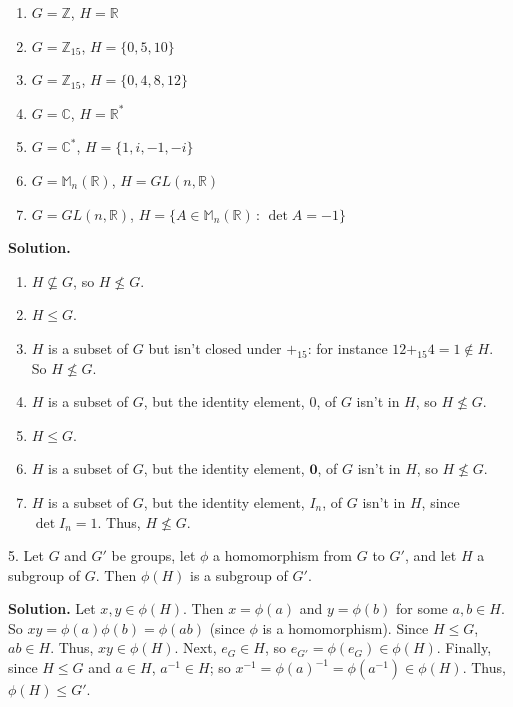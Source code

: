 \documentclass[10pt,]{book}
\theoremstyle{plain}
\theoremstyle{definition}
\theoremstyle{definition}
\theoremstyle{definition}
\theoremstyle{definition}
\numberwithin{equation}{section}
\def\Z{\mathbb{Z}}
\def\R{\mathbb{R}}
\def\C{\mathbb{C}}
\def\M{\mathbb{M}}
\def\0{\mathbf 0}
\begin{document}
\begin{exerciselist}
\begin{enumerate}[label=(\alph*)]
\item\hypertarget{li-232}{}\(G=\Z\), \(H=\R\)%
\item\hypertarget{li-233}{}\(G=\Z_{15}\), \(H=\{0,5,10\}\)%
\item\hypertarget{li-234}{}\(G=\Z_{15}\), \(H=\{0,4,8,12\}\)%
\item\hypertarget{li-235}{}\(G=\C\), \(H=\R^*\)%
\item\hypertarget{li-236}{}\(G=\C^*\), \(H=\{1,i,-1,-i\}\)%
\item\hypertarget{li-237}{}\(G=\M_n(\R)\), \(H=GL(n,\R)\)%
\item\hypertarget{li-238}{}\(G=GL(n,\R)\), \(H=\{A\in \M_n(\R)\,:\,\det A = -1\}\)%
\end{enumerate}
%
\par\smallskip
\par\smallskip
\noindent\textbf{Solution.}\hypertarget{solution-31}{}\quad
\leavevmode%
\begin{enumerate}[label=(\alph*)]
\item\hypertarget{li-239}{}\(H\not\subseteq G\), so \(H\not\leq G\).%
\item\hypertarget{li-240}{}\(H\leq G\).%
\item\hypertarget{li-241}{}\(H\) is a subset of \(G\) but isn't closed under \(+_{15}\): for instance \(12+_{15}4=1\not\in H\).  So \(H\not\leq G\).%
\item\hypertarget{li-242}{}\(H\) is a subset of \(G\), but the identity element, 0, of \(G\) isn't in \(H\), so \(H\not\leq G\).%
\item\hypertarget{li-243}{}\(H\leq G\).%
\item\hypertarget{li-244}{}\(H\) is a subset of \(G\), but the identity element, \(\0\), of \(G\) isn't in \(H\), so \(H\not\leq G\).%
\item\hypertarget{li-245}{}\(H\) is a subset of \(G\), but the identity element, \(I_n\), of \(G\) isn't in \(H\), since \(\det I_n=1\).  Thus, \(H\not\leq G\).%
\end{enumerate}
\item[5.]\hypertarget{exercise-32}{}Let \(G\) and \(G'\) be groups, let \(\phi\) a homomorphism from \(G\) to \(G'\), and let \(H\) a subgroup of \(G\). Then \(\phi(H)\) is a subgroup of \(G'\).%
\par\smallskip
\par\smallskip
\noindent\textbf{Solution.}\hypertarget{solution-32}{}\quad
Let \(x,y\in \phi(H)\). Then \(x=\phi(a)\) and \(y=\phi(b)\) for some \(a,b\in H\). So \(xy=\phi(a)\phi(b)=\phi(ab)\) (since \(\phi\) is a homomorphism). Since \(H\leq G\), \(ab\in H\). Thus, \(xy\in \phi(H)\). Next, \(e_G\in H\), so \(e_{G'}=\phi(e_G)\in \phi(H)\). Finally, since \(H\leq G\) and \(a\in H\), \(a^{-1}\in H\); so \(x^{-1}=\phi(a)^{-1}=\phi(a^{-1}) \in \phi(H)\). Thus, \(\phi(H)\leq G'\).%

\end{exerciselist}
\end{document}
